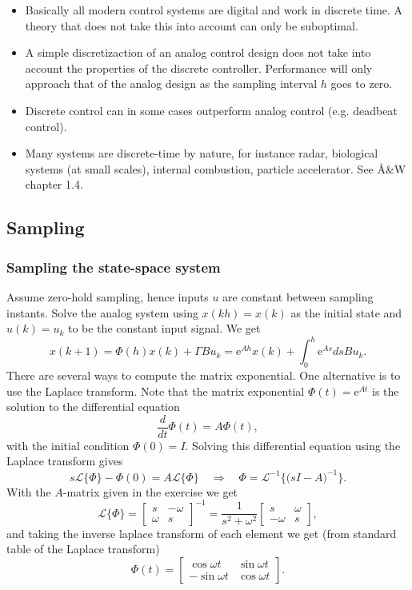 \documentclass{scrartcl}
\newcommand*{\mexp}[1]{\ensuremath{\mathrm{e}^{#1}}}
\newcommand*{\laplace}[1]{\ensuremath{\mathcal{L} \{#1\}}}
\newcommand*{\laplaceinv}[1]{\ensuremath{\mathcal{L}^{-1} \{#1\}}}
\newcommand*{\bbm}{\begin{bmatrix}}
\newcommand*{\ebm}{\end{bmatrix}}
\begin{document}
\begin{itemize}
\item Basically all modern control systems are digital and work in discrete time. A theory that does not take this into account can only be suboptimal.
\item A simple discretizaction of an analog control design does not take into account the properties of the discrete controller. Performance will only approach that of the analog design as the sampling interval $h$ goes to zero.
\item Discrete control can in some cases outperform analog control (e.g. deadbeat control).
\item Many systems are discrete-time by nature, for instance radar, biological systems (at small scales), internal combustion, particle accelerator. See Å\&W chapter 1.4.
\end{itemize}
\subsection{Sampling}
\label{sec-2-2}
\subsubsection{Sampling the state-space system}
\label{sec-2-2-1}

    Assume zero-hold sampling, hence inputs $u$ are constant between sampling instants. Solve the analog system using $x(kh) = x(k)$ as the initial state and $u(k)=u_k$ to be the constant input signal. We get
\begin{equation*}
x(k+1) = \Phi(h)x(k) + \Gamma B u_k = \mexp{Ah}x(k) + \int_0^h \mexp{As}ds B u_k.
\end{equation*}
There are several ways to compute the matrix exponential. One alternative is to use the Laplace transform. Note that the matrix exponential $\Phi(t)=\mexp{At}$ is the solution to the differential equation
\begin{equation*}
\frac{d}{dt} \Phi(t) = A\Phi(t),
\end{equation*}
with the initial condition $\Phi(0) = I$. Solving this differential equation using the Laplace transform gives
\begin{equation*}
s\laplace{\Phi} - \Phi(0) = A\laplace{\Phi} \quad \Rightarrow \quad \Phi = \laplaceinv{\big(sI - A\big)^{-1}}.
\end{equation*}
With the $A$-matrix given in the exercise we get
\begin{equation*}
\laplace{\Phi} = \bbm s & -\omega\\ \omega & s\ebm^{-1}
               = \frac{1}{s^2 + \omega^2} \bbm s & \omega\\ -\omega & s \ebm, 
\end{equation*}
and taking the inverse laplace transform of each element we get (from standard table of the Laplace transform)
\begin{equation*}
\Phi(t) = \bbm \cos \omega t & \sin \omega t\\ -\sin \omega t & \cos \omega t \ebm.
\end{equation*}
\end{document}
